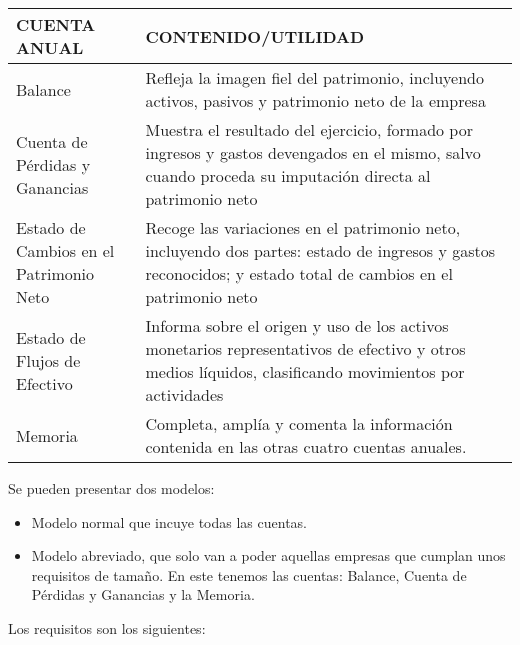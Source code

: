 \documentclass[a4paper,12pt]{article}
\begin{document}
\begin{table}[H]
    \centering
    \begin{tabular}{|p{5cm}|p{5cm}|}
    \hline
    \textbf{CUENTA ANUAL} & \textbf{CONTENIDO/UTILIDAD} \\ \hline
    Balance & Refleja la imagen fiel del patrimonio, incluyendo activos, pasivos y patrimonio neto de la empresa \\ \hline
    Cuenta de Pérdidas y Ganancias & Muestra el resultado del ejercicio, formado por ingresos y gastos devengados en el mismo, salvo cuando proceda su imputación directa al patrimonio neto \\ \hline
    Estado de Cambios en el Patrimonio Neto & Recoge las variaciones en el patrimonio neto, incluyendo dos partes: estado de ingresos y gastos reconocidos; y estado total de cambios en el patrimonio neto \\ \hline
    Estado de Flujos de Efectivo & Informa sobre el origen y uso de los activos monetarios representativos de efectivo y otros medios líquidos, clasificando movimientos por actividades \\ \hline
    Memoria & Completa, amplía y comenta la información contenida en las otras cuatro cuentas anuales. \\ \hline
    \end{tabular}
\end{table}

Se pueden presentar dos modelos:
\begin{itemize}
    \item Modelo normal que incuye todas las cuentas.
    \item Modelo abreviado, que solo van a poder aquellas empresas que cumplan unos requisitos de tamaño. En este tenemos las cuentas: Balance, Cuenta de Pérdidas y Ganancias y la Memoria.
\end{itemize}
    
Los requisitos son los siguientes:
\end{document}
